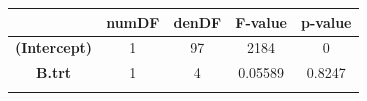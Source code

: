 \documentclass[]{article}
\begin{document}
\begin{longtable}[]{@{}ccccc@{}}
\toprule
\begin{minipage}[b]{0.29\columnwidth}\centering\strut
~
\strut\end{minipage} &
\begin{minipage}[b]{0.10\columnwidth}\centering\strut
numDF
\strut\end{minipage} &
\begin{minipage}[b]{0.10\columnwidth}\centering\strut
denDF
\strut\end{minipage} &
\begin{minipage}[b]{0.12\columnwidth}\centering\strut
F-value
\strut\end{minipage} &
\begin{minipage}[b]{0.12\columnwidth}\centering\strut
p-value
\strut\end{minipage}\tabularnewline
\midrule
\endhead
\begin{minipage}[t]{0.29\columnwidth}\centering\strut
\textbf{(Intercept)}
\strut\end{minipage} &
\begin{minipage}[t]{0.10\columnwidth}\centering\strut
1
\strut\end{minipage} &
\begin{minipage}[t]{0.10\columnwidth}\centering\strut
97
\strut\end{minipage} &
\begin{minipage}[t]{0.12\columnwidth}\centering\strut
2184
\strut\end{minipage} &
\begin{minipage}[t]{0.12\columnwidth}\centering\strut
0
\strut\end{minipage}\tabularnewline
\begin{minipage}[t]{0.29\columnwidth}\centering\strut
\textbf{B.trt}
\strut\end{minipage} &
\begin{minipage}[t]{0.10\columnwidth}\centering\strut
1
\strut\end{minipage} &
\begin{minipage}[t]{0.10\columnwidth}\centering\strut
4
\strut\end{minipage} &
\begin{minipage}[t]{0.12\columnwidth}\centering\strut
0.05589
\strut\end{minipage} &
\begin{minipage}[t]{0.12\columnwidth}\centering\strut
0.8247
\strut\end{minipage}\tabularnewline
\begin{minipage}[t]{0.29\columnwidth}\centering\strut

\end{minipage}
\end{longtable}
\end{document}
